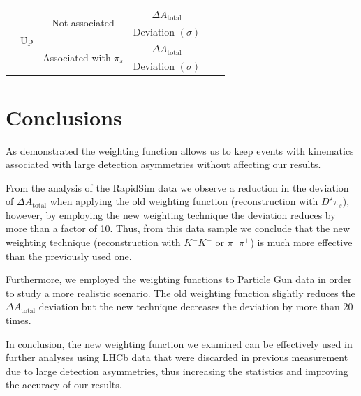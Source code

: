 \documentclass{article}
\begin{document}
\begin{center}
\begin{tabular}{c|c|c|c|c|c}
                        \cline{2-6}
                        & \multirow{4}{*}{Up} & \multirow{2}{*}{Not associated} & $\Delta A_\text{total}$ & & \\
                        & & & Deviation $(\sigma)$ & & \\
                        \cline{3-5}
                        & & \multirow{2}{*}{Associated with $\pi_s$} & $\Delta A_\text{total}$ & & \\
                        & & & Deviation $(\sigma)$ & & \\
                \end{tabular}

        \end{center}

        \section{Conclusions}
        As demonstrated the weighting function allows us to keep events with kinematics associated with large detection asymmetries without affecting our results.

        From the analysis of the RapidSim data we observe a reduction in the deviation of $\Delta A_\text{total}$ when applying the old weighting function (reconstruction with $D^\star\pi_s$), however, by employing the new weighting technique the deviation reduces by more than a factor of 10.
        Thus, from this data sample we conclude that the new weighting technique (reconstruction with $K^-K^+ \text{ or } \pi^-\pi^+$) is much more effective than the previously used one.

        Furthermore, we employed the weighting functions to Particle Gun data in order to study a more realistic scenario.
        The old weighting function slightly reduces the $\Delta A_\text{total}$ deviation but the new technique decreases the deviation by more than 20 times.
        
        In conclusion, the new weighting function we examined can be effectively used in further analyses using LHCb data that were discarded in previous measurement due to large detection asymmetries, thus increasing the statistics and improving the accuracy of our results.
        
        \pagebreak
        \nocite{*}
        \printbibliography[notcategory=cited]
\end{document}
